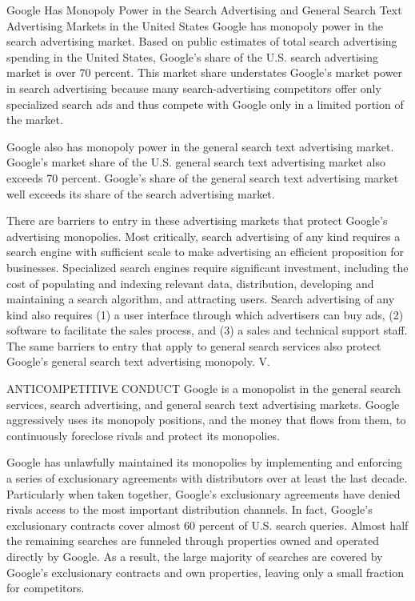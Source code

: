 \documentclass[11pt,b5paper]{scrartcl}
\begin{document}



Google Has Monopoly Power in the Search Advertising and General
Search Text Advertising Markets in the United States
Google has monopoly power in the search advertising market. Based on public
estimates of total search advertising spending in the United States, Google’s share of the U.S.
search advertising market is over 70 percent. This market share understates Google’s market
power in search advertising because many search-advertising competitors offer only specialized
search ads and thus compete with Google only in a limited portion of the market.


Google also has monopoly power in the general search text advertising market.
Google’s market share of the U.S. general search text advertising market also exceeds
70 percent. Google’s share of the general search text advertising market well exceeds its share of
the search advertising market.


There are barriers to entry in these advertising markets that protect Google’s
advertising monopolies. Most critically, search advertising of any kind requires a search engine
with sufficient scale to make advertising an efficient proposition for businesses. Specialized
search engines require significant investment, including the cost of populating and indexing
relevant data, distribution, developing and maintaining a search algorithm, and attracting users.
Search advertising of any kind also requires (1) a user interface through which advertisers can
buy ads, (2) software to facilitate the sales process, and (3) a sales and technical support staff.
The same barriers to entry that apply to general search services also protect Google’s general
search text advertising monopoly.
V.


ANTICOMPETITIVE CONDUCT
Google is a monopolist in the general search services, search advertising, and
general search text advertising markets. Google aggressively uses its monopoly positions, and
the money that flows from them, to continuously foreclose rivals and protect its monopolies.


Google has unlawfully maintained its monopolies by implementing and enforcing
a series of exclusionary agreements with distributors over at least the last decade. Particularly
when taken together, Google’s exclusionary agreements have denied rivals access to the most
important distribution channels. In fact, Google’s exclusionary contracts cover almost 60 percent
of U.S. search queries. Almost half the remaining searches are funneled through properties
owned and operated directly by Google. As a result, the large majority of searches are covered
by Google’s exclusionary contracts and own properties, leaving only a small fraction for
competitors.
\end{document}
